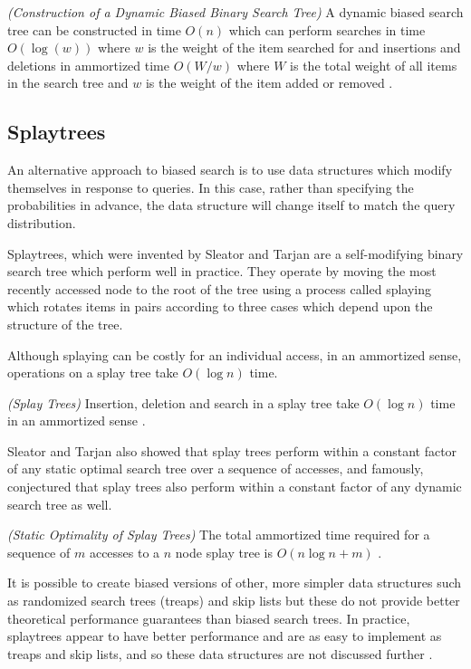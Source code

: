 \documentclass[mcs]{scsthesis}
\begin{document}
\begin{thm} \emph{(Construction of a Dynamic Biased Binary Search Tree)} 
A dynamic biased search tree can be constructed in time \(O(n)\) which can
perform searches in time \(O(\log(w))\) where \(w\) is the weight of the item
searched for and insertions and deletions in ammortized time \(O(W / w)\)
where \(W\) is the total weight of all items in the search tree and \(w\) is
the weight of the item added or removed \cite{bst2}.
\end{thm}

\subsection{Splaytrees}

An alternative approach to biased search is to use data structures which
modify themselves in response to queries.  In this case, rather than specifying
the probabilities in advance, the data structure will change itself to match
the query distribution. 

Splaytrees, which were invented by Sleator and Tarjan \cite{splaytree} are a
self-modifying binary search tree which perform well in practice.  They operate
by moving the most recently accessed node to the root of the tree using a
process called splaying which rotates items in pairs according to three cases
which depend upon the structure of the tree.

Although splaying can be costly for an individual access, in an ammortized
sense, operations on a splay tree take \(O(\log n)\) time.

\begin{thm} \emph{(Splay Trees)} 
Insertion, deletion and search in a splay tree take \(O(\log n)\) time in
an ammortized sense \cite{splaytree}.
\end{thm}

Sleator and Tarjan also showed that splay trees perform within a constant
factor of any static optimal search tree over a sequence of accesses, and
famously, conjectured that splay trees also perform within a constant factor
of any dynamic search tree as well.

\begin{thm} \emph{(Static Optimality of Splay Trees)} 
The total ammortized time required for a sequence of \(m\) accesses to a \(n\)
node splay tree is \(O(n \log n + m)\) \cite{splaytree}.
\end{thm}

It is possible to create biased versions of other, more simpler data structures
such as randomized search trees (treaps) \cite{treap} and skip lists
\cite{bsl2} but these do not provide better theoretical performance guarantees
than biased search trees. In practice, splaytrees appear to have better
performance and are as easy to implement as treaps and skip lists, and so these
data structures are not discussed further \cite{minor}.
\end{document}
